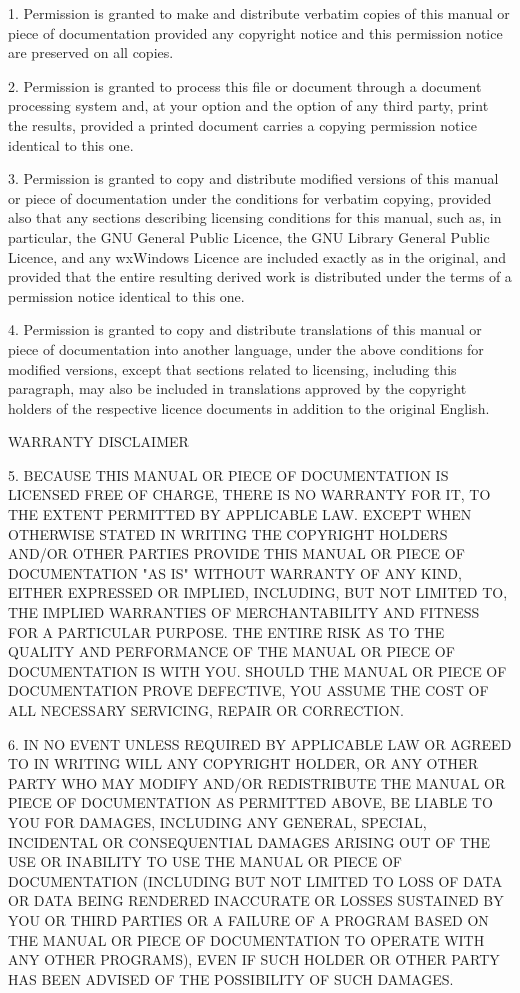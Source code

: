1. Permission is granted to make and distribute verbatim copies of this
manual or piece of documentation provided any copyright notice and this
permission notice are preserved on all copies.

2. Permission is granted to process this file or document through a
document processing system and, at your option and the option of any third
party, print the results, provided a printed document carries a copying
permission notice identical to this one.

3. Permission is granted to copy and distribute modified versions of this
manual or piece of documentation under the conditions for verbatim copying,
provided also that any sections describing licensing conditions for this
manual, such as, in particular, the GNU General Public Licence, the GNU
Library General Public Licence, and any wxWindows Licence are included
exactly as in the original, and provided that the entire resulting derived
work is distributed under the terms of a permission notice identical to
this one.

4. Permission is granted to copy and distribute translations of this manual
or piece of documentation into another language, under the above conditions
for modified versions, except that sections related to licensing, including
this paragraph, may also be included in translations approved by the
copyright holders of the respective licence documents in addition to the
original English.

\begin{center}
	WARRANTY DISCLAIMER
\end{center}

5. BECAUSE THIS MANUAL OR PIECE OF DOCUMENTATION IS LICENSED FREE OF
CHARGE, THERE IS NO WARRANTY FOR IT, TO THE EXTENT PERMITTED BY APPLICABLE
LAW.  EXCEPT WHEN OTHERWISE STATED IN WRITING THE COPYRIGHT HOLDERS AND/OR
OTHER PARTIES PROVIDE THIS MANUAL OR PIECE OF DOCUMENTATION "AS IS" WITHOUT
WARRANTY OF ANY KIND, EITHER EXPRESSED OR IMPLIED, INCLUDING, BUT NOT
LIMITED TO, THE IMPLIED WARRANTIES OF MERCHANTABILITY AND FITNESS FOR A
PARTICULAR PURPOSE.  THE ENTIRE RISK AS TO THE QUALITY AND PERFORMANCE OF
THE MANUAL OR PIECE OF DOCUMENTATION IS WITH YOU.  SHOULD THE MANUAL OR
PIECE OF DOCUMENTATION PROVE DEFECTIVE, YOU ASSUME THE COST OF ALL
NECESSARY SERVICING, REPAIR OR CORRECTION.

6. IN NO EVENT UNLESS REQUIRED BY APPLICABLE LAW OR AGREED TO IN WRITING
WILL ANY COPYRIGHT HOLDER, OR ANY OTHER PARTY WHO MAY MODIFY AND/OR
REDISTRIBUTE THE MANUAL OR PIECE OF DOCUMENTATION AS PERMITTED ABOVE, BE
LIABLE TO YOU FOR DAMAGES, INCLUDING ANY GENERAL, SPECIAL, INCIDENTAL OR
CONSEQUENTIAL DAMAGES ARISING OUT OF THE USE OR INABILITY TO USE THE MANUAL
OR PIECE OF DOCUMENTATION (INCLUDING BUT NOT LIMITED TO LOSS OF DATA OR
DATA BEING RENDERED INACCURATE OR LOSSES SUSTAINED BY YOU OR THIRD PARTIES
OR A FAILURE OF A PROGRAM BASED ON THE MANUAL OR PIECE OF DOCUMENTATION TO
OPERATE WITH ANY OTHER PROGRAMS), EVEN IF SUCH HOLDER OR OTHER PARTY HAS
BEEN ADVISED OF THE POSSIBILITY OF SUCH DAMAGES.
